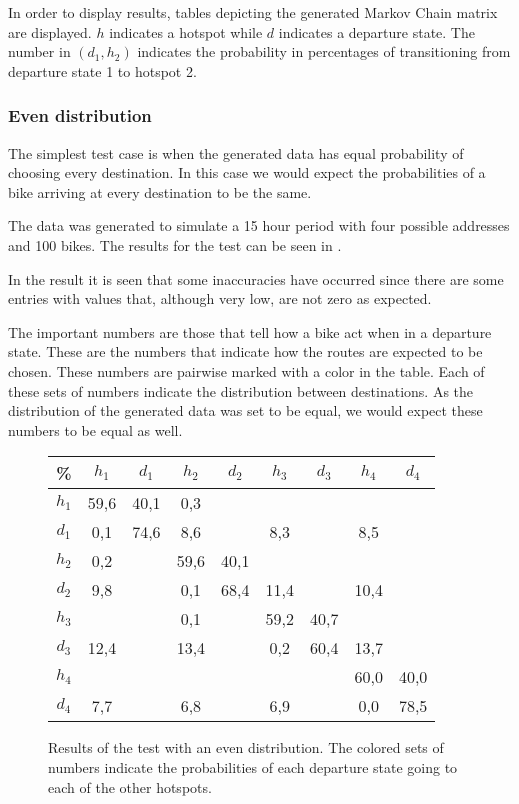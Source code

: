 In order to display results, tables depicting the generated Markov Chain matrix are displayed.
$h$ indicates a hotspot while $d$ indicates a departure state.
The number in $ (d_1,h_2) $ indicates the probability in percentages of transitioning from departure state 1 to hotspot 2. 

\subsubsection{Even distribution}
The simplest test case is when the generated data has equal probability of choosing every destination. 
In this case we would expect the probabilities of a bike arriving at every destination to be the same.

The data was generated to simulate a 15 hour period with four possible addresses and 100 bikes.
The results for the test can be seen in .

In the result it is seen that some inaccuracies have occurred since there are some entries with values that, although very low, are not zero as expected.

The important numbers are those that tell how a bike act when in a departure state.
These are the numbers that indicate how the routes are expected to be chosen.
These numbers are pairwise marked with a color in the table.
Each of these sets of numbers indicate the distribution between destinations.
As the distribution of the generated data was set to be equal, we would expect these numbers to be equal as well.

\begin{figure}
	\centering
\begin{tabular}{|c | c c c c c c c c|}
\hline
\% &      $ h_1 $ & $ d_1 $ & $ h_2 $ & $ d_2 $ & $ h_3 $ & $ d_3 $ & $ h_4 $ & $ d_4 $\\
 \hline
$ h_1 $ & 59,6 &  40,1 & 0,3 &   &   &   &   &  \\
$ d_1 $ & 0,1 &  74,6 &  { \color{red} 8,6} &   &   {\color{red}8,3} &   &  {\color{red} 8,5} &  \\
$ h_2 $ & 0,2 &   &  59,6 &  40,1 &   &   &   &  \\
$ d_2 $ & {\color{blue}9,8} &   &   0,1 &  68,4 &  {\color{blue}11,4} &   &  {\color{blue}10,4} &  \\
$ h_3 $ & &   &   0,1 &   &  59,2 &  40,7 &   &  \\
$ d_3 $ & {\color{orange}12,4} &   &  {\color{orange}13,4} &   &   0,2 &  60,4 &  {\color{orange}13,7} &  \\
$ h_4 $ & &   &   &   &   &   &  60,0 &  40,0\\
$ d_4 $ & {\color{purple}7,7} &   &   {\color{purple}6,8} &   &   {\color{purple}6,9} &   &   0,0 &  78,5\\
\hline
\end{tabular}
\caption{Results of the test with an even distribution. The colored sets of numbers indicate the probabilities of each departure state going to each of the other hotspots.}\label{test_even}
\end{figure}

